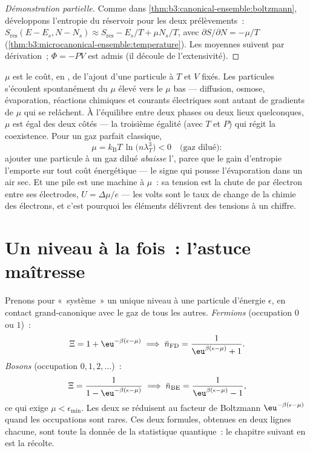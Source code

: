\begin{proof}[Démonstration partielle]
Comme dans \cref{thm:b3:canonical-ensemble:boltzmann}, développons
l'entropie du réservoir pour les deux prélèvements~:
$S_{\text{res}}(E - E_s, N - N_s) \approx S_{\text{res}} - E_s/T +
\mu N_s/T$, avec $\partial S/\partial N = -\mu/T$
(\cref{thm:b3:microcanonical-ensemble:temperature}). Les moyennes
suivent par dérivation~; $\Phi = -PV$ est admis (il découle de
l'extensivité).
\end{proof}

\begin{definition}\label{def:b3:grand-canonical:mu}
$\mu$ est le coût, en , de l'ajout d'une particule à $T$
et $V$ fixés. Les particules s'écoulent spontanément du $\mu$ élevé
vers le $\mu$ bas --- diffusion, osmose, évaporation, réactions
chimiques et courants électriques sont autant de gradients de $\mu$
qui se relâchent. À l'équilibre entre deux phases ou deux lieux
quelconques, $\mu$ est égal des deux côtés --- la troisième égalité
(avec $T$ et $P$) qui régit la coexistence. Pour un gaz parfait
classique,
\[
\mu = k_{\text{B}}T\,\ln\!\big(n\lambda_T^3\big) < 0
\quad\text{(gaz dilué)} :
\]
ajouter une particule à un gaz dilué \emph{abaisse} l',
parce que le gain d'entropie l'emporte sur tout coût énergétique ---
le signe qui pousse l'évaporation dans un air sec. Et une pile est une
machine à $\mu$~: sa tension est la chute de  par
électron entre ses électrodes, $U = \Delta\mu/e$ --- les volts sont le
taux de change de la chimie des électrons, et c'est pourquoi les
éléments délivrent des tensions à un chiffre.
\end{definition}

\section{Un niveau à la fois~: l'astuce maîtresse}

\begin{theorem}\label{thm:b3:grand-canonical:occupation}
Prenons pour «~système~» un unique niveau à une particule d'énergie
$\epsilon$, en contact grand-canonique avec le gaz de tous les autres.
\emph{Fermions} (occupation $0$ ou $1$)~:
\[
\Xi = 1 + \eu^{-\beta(\epsilon - \mu)}
\;\Longrightarrow\;
\bar n_{\text{FD}} = \frac{1}{\eu^{\beta(\epsilon - \mu)} + 1} .
\]
\emph{Bosons} (occupation $0, 1, 2, \dots$)~:
\[
\Xi = \frac{1}{1 - \eu^{-\beta(\epsilon - \mu)}}
\;\Longrightarrow\;
\bar n_{\text{BE}} = \frac{1}{\eu^{\beta(\epsilon - \mu)} - 1} ,
\]
ce qui exige $\mu < \epsilon_{\min}$. Les deux se réduisent au facteur
de Boltzmann $\eu^{-\beta(\epsilon - \mu)}$ quand les occupations sont
rares. Ces deux formules, obtenues en deux lignes chacune, sont toute
la donnée de la statistique quantique~: le chapitre suivant en est la
récolte.
\end{theorem}

